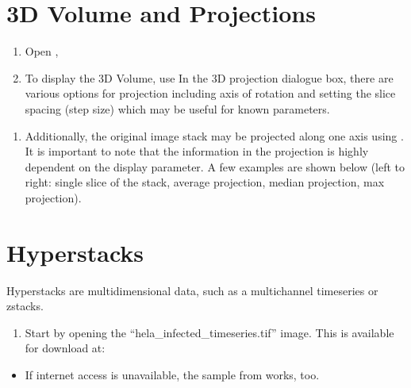 \documentclass[letterpaper,10pt,english]{jupyterBook}
\begin{document}
\section{3D Volume and Projections}
\label{\detokenize{basics:d-volume-and-projections}}\begin{enumerate}
%
\item {} 
\sphinxAtStartPar
Open , 

\item {} 
\sphinxAtStartPar
To display the 3D Volume, use 
In the 3D projection dialogue box, there are various options for projection including
axis of rotation and setting the slice spacing (step size) which may be useful for
known parameters.

\end{enumerate}

\sphinxAtStartPar
{}
\begin{enumerate}
%
\setcounter{enumi}{2}
\item {} 
\sphinxAtStartPar
Additionally, the original image stack may be projected along one axis using . It is important to note that the information in the projection is highly
dependent on the display parameter. A few examples are shown below (left to right:
single slice of the stack, average projection, median projection, max projection).

\end{enumerate}

\sphinxAtStartPar
{}


\section{Hyperstacks}
\label{\detokenize{basics:hyperstacks}}
\sphinxAtStartPar
Hyperstacks are multidimensional data, such as a multichannel timeseries or z\sphinxhyphen{}stacks.
\begin{enumerate}
%
\item {} 
\sphinxAtStartPar
Start by opening the “hela\_infected\_timeseries.tif” image. This is available for download
at: 

\end{enumerate}
\begin{itemize}
\item {} 
\sphinxAtStartPar
If internet access is unavailable, the  sample from  works, too.

\end{itemize}
\end{document}
